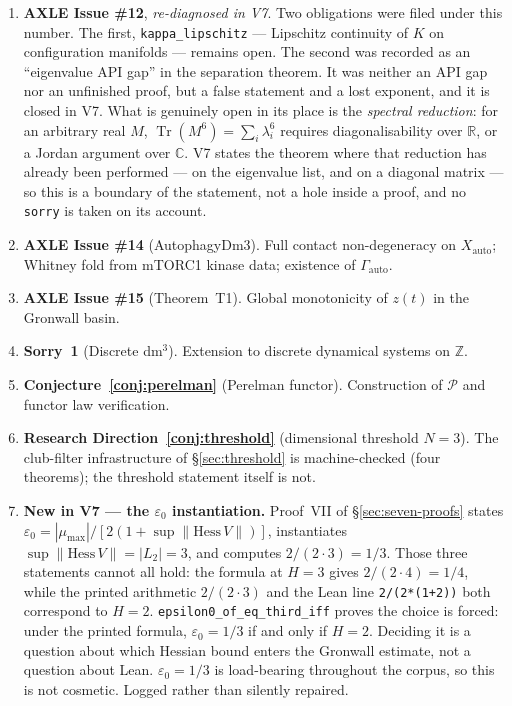 \documentclass[14pt,a4paper]{extarticle}
\begin{document}
\begin{enumerate}[label=\textbf{O\arabic*.},leftmargin=3em]
  \item \textbf{AXLE Issue \#12}, \emph{re-diagnosed in V7}.
    Two obligations were filed under this number. The first,
    \texttt{kappa\_lipschitz} --- Lipschitz continuity of $K$ on
    configuration manifolds --- remains open. The second was recorded as an
    ``eigenvalue API gap'' in the separation theorem. It was neither an API
    gap nor an unfinished proof, but a false statement and a lost exponent,
    and it is closed in V7. What is genuinely open in its place is the
    \emph{spectral reduction}: for an arbitrary real $M$,
    $\operatorname{Tr}(M^6) = \sum_i \lambda_i^6$ requires
    diagonalisability over $\mathbb{R}$, or a Jordan argument over
    $\mathbb{C}$. V7 states the theorem where that reduction has already
    been performed --- on the eigenvalue list, and on a diagonal matrix ---
    so this is a boundary of the statement, not a hole inside a proof, and
    no \texttt{sorry} is taken on its account.
  \item \textbf{AXLE Issue \#14} (AutophagyDm3).
    Full contact non-degeneracy on $X_\mathrm{auto}$;
    Whitney fold from mTORC1 kinase data;
    existence of $\Gamma_\mathrm{auto}$.
  \item \textbf{AXLE Issue \#15} (Theorem~T1).
    Global monotonicity of $z(t)$ in the Gronwall basin.
  \item \textbf{Sorry~1} (Discrete dm$^3$).
    Extension to discrete dynamical systems on $\mathbb{Z}$.
  \item \textbf{Conjecture~\ref{conj:perelman}} (Perelman functor).
    Construction of $\mathcal{P}$ and functor law verification.
  \item \textbf{Research Direction~\ref{conj:threshold}} (dimensional
    threshold $N=3$). The club-filter infrastructure of
    \S\ref{sec:threshold} is machine-checked (four theorems); the
    threshold statement itself is not.
  \item \textbf{New in V7 --- the $\varepsilon_0$ instantiation.}
    Proof~VII of \S\ref{sec:seven-proofs} states
    $\varepsilon_0 = |\mu_{\max}|/[2(1+\sup\|\mathrm{Hess}\,V\|)]$,
    instantiates $\sup\|\mathrm{Hess}\,V\| = |L_2| = 3$, and computes
    $2/(2\cdot 3) = 1/3$. Those three statements cannot all hold: the
    formula at $H=3$ gives $2/(2\cdot 4) = 1/4$, while the printed
    arithmetic $2/(2\cdot 3)$ and the Lean line \texttt{2/(2*(1+2))} both
    correspond to $H = 2$. \texttt{epsilon0\_of\_eq\_third\_iff} proves the
    choice is forced: under the printed formula, $\varepsilon_0 = 1/3$ if
    and only if $H = 2$. Deciding it is a question about which Hessian
    bound enters the Gronwall estimate, not a question about Lean.
    $\varepsilon_0 = 1/3$ is load-bearing throughout the corpus, so this is
    not cosmetic. Logged rather than silently repaired.
\end{enumerate}
\end{document}
